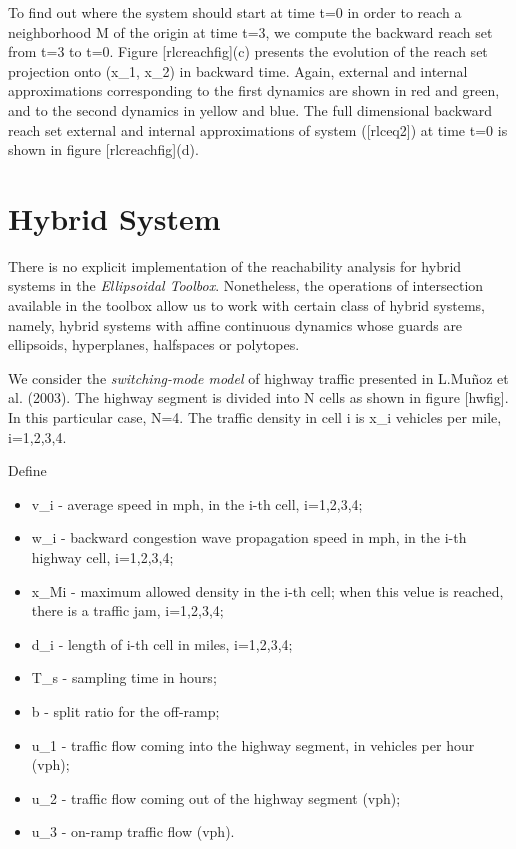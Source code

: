 \documentclass[letterpaper,10pt,english]{sphinxmanual}
\begin{document}
To find out where the system should start at time t=0 in order
to reach a neighborhood M of the origin at time t=3, we compute
the backward reach set from t=3 to t=0. Figure
{[}rlcreachfig{]}(c) presents the evolution of the reach set projection onto
(x_1, x_2) in backward time. Again, external and internal
approximations corresponding to the first dynamics are shown in red and
green, and to the second dynamics in yellow and blue. The full
dimensional backward reach set external and internal approximations of
system ({[}rlceq2{]}) at time t=0 is shown in figure
{[}rlcreachfig{]}(d).


\section{Hybrid System}
\label{chap_examples:hybrid-system}
There is no explicit implementation of the reachability analysis for
hybrid systems in the \emph{Ellipsoidal Toolbox}. Nonetheless, the operations
of intersection available in the toolbox allow us to work with certain
class of hybrid systems, namely, hybrid systems with affine continuous
dynamics whose guards are ellipsoids, hyperplanes, halfspaces or
polytopes.

We consider the \emph{switching-mode model} of highway traffic presented in
L.Muñoz et al. (2003). The highway segment is divided into N
cells as shown in figure {[}hwfig{]}. In this particular case, N=4.
The traffic density in cell i is x_i vehicles per mile,
i=1,2,3,4.

Define
\begin{itemize}
\item {} 
v_i - average speed in mph, in the i-th cell,
i=1,2,3,4;

\item {} 
w_i - backward congestion wave propagation speed in mph, in
the i-th highway cell, i=1,2,3,4;

\item {} 
x_{Mi} - maximum allowed density in the i-th cell;
when this velue is reached, there is a traffic jam,
i=1,2,3,4;

\item {} 
d_i - length of i-th cell in miles,
i=1,2,3,4;

\item {} 
T_s - sampling time in hours;

\item {} 
b - split ratio for the off-ramp;

\item {} 
u_1 - traffic flow coming into the highway segment, in
vehicles per hour (vph);

\item {} 
u_2 - traffic flow coming out of the highway segment (vph);

\item {} 
u_3 - on-ramp traffic flow (vph).

\end{itemize}
\end{document}
